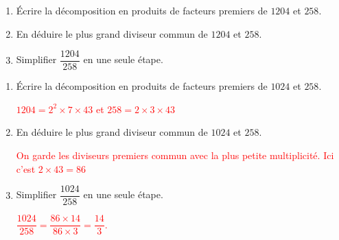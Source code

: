 \begin{exercice*}
    \begin{enumerate}
        \item Écrire la décomposition en produits de facteurs premiers de $\num{1204}$ et $258$.
        \item En déduire le plus grand diviseur commun de $\num{1204}$ et $258$.
        \item Simplifier $\dfrac{\num{1204}}{258}$ en une seule étape.        
    \end{enumerate}    
\end{exercice*}
\begin{corrige}
        \begin{enumerate}
            \item Écrire la décomposition en produits de facteurs premiers de $\num{1024}$ et $258$.
            
            \textcolor{red}{
                $\num{1204} = 2^2\times 7\times 43$ et $258=2\times 3\times 43$
            }
            \item En déduire le plus grand diviseur commun de $\num{1024}$ et $258$.
            
            \textcolor{red}{
                On garde les diviseurs premiers commun avec la plus petite multiplicité.
                Ici c'est $2\times 43 = 86$                
            }  
            \item Simplifier $\dfrac{\num{1024}}{258}$ en une seule étape.
            
            \textcolor{red}{
                $\dfrac{\num{1024}}{258}=\dfrac{86\times 14}{86\times 3}=\dfrac{14}{3}$.                
            }    
        \end{enumerate}       
\end{corrige}

